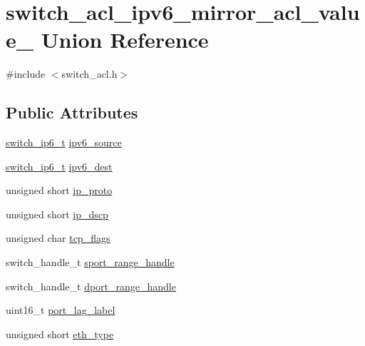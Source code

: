 \hypertarget{unionswitch__acl__ipv6__mirror__acl__value__}{\section{switch\+\_\+acl\+\_\+ipv6\+\_\+mirror\+\_\+acl\+\_\+value\+\_\+ Union Reference}
\label{unionswitch__acl__ipv6__mirror__acl__value__}
}


{\ttfamily \#include $<$switch\+\_\+acl.\+h$>$}

\subsection*{Public Attributes}
\begin{DoxyCompactItemize}
\item 
\hyperlink{structswitch__uint128__t}{switch\+\_\+ip6\+\_\+t} \hyperlink{unionswitch__acl__ipv6__mirror__acl__value___a6721f17e8585f51a0df1f0f1c1774fe2}{ipv6\+\_\+source}
\item 
\hyperlink{structswitch__uint128__t}{switch\+\_\+ip6\+\_\+t} \hyperlink{unionswitch__acl__ipv6__mirror__acl__value___ae064764f99f2119914862464dff17936}{ipv6\+\_\+dest}
\item 
unsigned short \hyperlink{unionswitch__acl__ipv6__mirror__acl__value___a3fe6e00cac0d3ee98488127835c3cb03}{ip\+\_\+proto}
\item 
unsigned short \hyperlink{unionswitch__acl__ipv6__mirror__acl__value___ab76ba99473cb9769a3c3d6e69f420921}{ip\+\_\+dscp}
\item 
unsigned char \hyperlink{unionswitch__acl__ipv6__mirror__acl__value___acdae9390c4170ad1af05a822d7e3184e}{tcp\+\_\+flags}
\item 
switch\+\_\+handle\+\_\+t \hyperlink{unionswitch__acl__ipv6__mirror__acl__value___af42bddfd4521dee70f84d394cc62b1c5}{sport\+\_\+range\+\_\+handle}
\item 
switch\+\_\+handle\+\_\+t \hyperlink{unionswitch__acl__ipv6__mirror__acl__value___aa4b4bdbff2f177731df73392fd2a60d6}{dport\+\_\+range\+\_\+handle}
\item 
uint16\+\_\+t \hyperlink{unionswitch__acl__ipv6__mirror__acl__value___a4a8d2887d81e205416a316b7920a0c33}{port\+\_\+lag\+\_\+label}
\item 
unsigned short \hyperlink{unionswitch__acl__ipv6__mirror__acl__value___a21594172b2ab6b29aa563ae436888f48}{eth\+\_\+type}
\end{DoxyCompactItemize}


